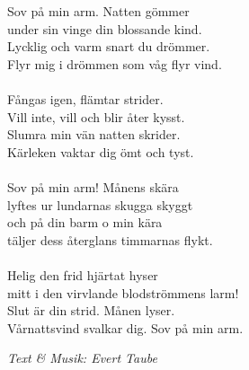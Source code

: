 \vspace{10pt}
Sov på min arm. Natten gömmer\\
under sin vinge din blossande kind.\\
Lycklig och varm snart du drömmer.\\
Flyr mig i drömmen som våg flyr vind.\\
\\
Fångas igen, flämtar strider.\\
Vill inte, vill och blir åter kysst.\\
Slumra min vän natten skrider.\\
Kärleken vaktar dig ömt och tyst.\\
\\
Sov på min arm! Månens skära\\
lyftes ur lundarnas skugga skyggt\\
och på din barm o min kära\\
täljer dess återglans timmarnas flykt.\\
\\
Helig den frid hjärtat hyser\\
mitt i den virvlande blodströmmens larm!\\
Slut är din strid. Månen lyser.\\
Vårnattsvind svalkar dig. Sov på min arm.
\par
\vspace{10pt}
{\footnotesize\textit{Text & Musik: Evert Taube}}
